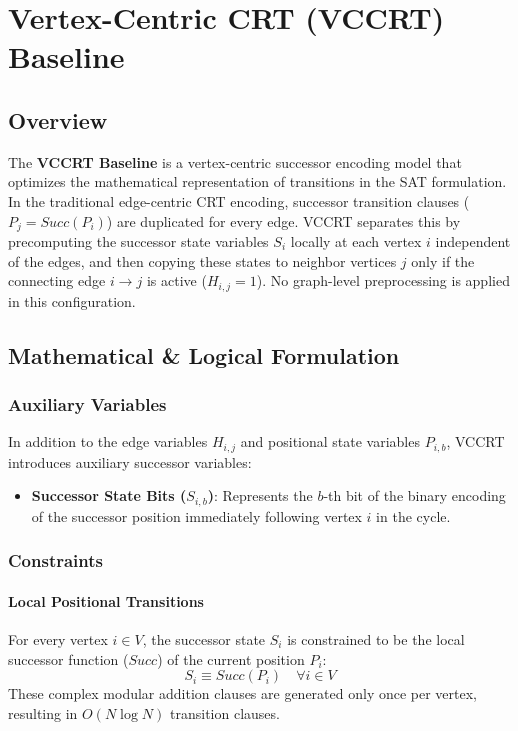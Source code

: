 \section{Vertex-Centric CRT (VCCRT) Baseline}
\label{sec:vccrt_baseline}

\subsection{Overview}
The \textbf{VCCRT Baseline} is a vertex-centric successor encoding model that optimizes the mathematical representation of transitions in the SAT formulation.
In the traditional edge-centric CRT encoding, successor transition clauses ($P_j = Succ(P_i)$) are duplicated for every edge.
VCCRT separates this by precomputing the successor state variables $S_i$ locally at each vertex $i$ independent of the edges, and then copying these states to neighbor vertices $j$ only if the connecting edge $i \to j$ is active ($H_{i,j} = 1$).
No graph-level preprocessing is applied in this configuration.

\subsection{Mathematical \& Logical Formulation}

\subsubsection{Auxiliary Variables}
In addition to the edge variables $H_{i,j}$ and positional state variables $P_{i,b}$, VCCRT introduces auxiliary successor variables:
\begin{itemize}
    \item \textbf{Successor State Bits ($S_{i,b}$)}: Represents the $b$-th bit of the binary encoding of the successor position immediately following vertex $i$ in the cycle.
\end{itemize}

\subsubsection{Constraints}

\paragraph{Local Positional Transitions}
For every vertex $i \in V$, the successor state $S_i$ is constrained to be the local successor function ($Succ$) of the current position $P_i$:
\begin{equation}
    S_i \equiv Succ(P_i) \quad \forall i \in V
\end{equation}
These complex modular addition clauses are generated only once per vertex, resulting in $O(N \log N)$ transition clauses.

